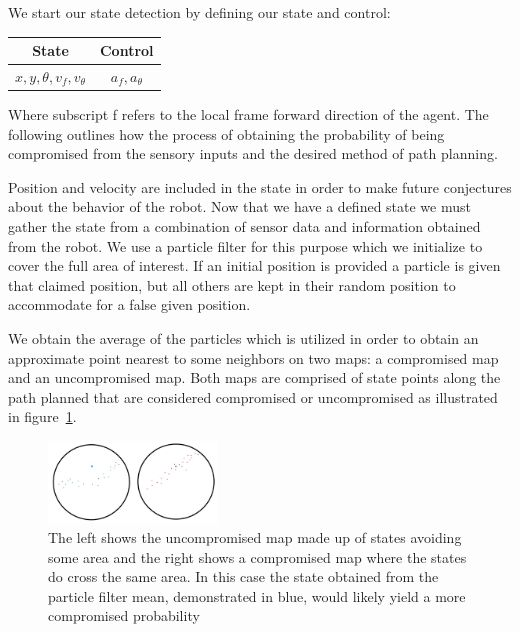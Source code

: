 \documentclass[conference]{IEEEtran}
\begin{document}
We start our state detection by defining our state and control:

\begin{table}[]
\label{table_example}
\begin{center}
\begin{tabular}{|c|c|}
\hline
State & Control\\
\hline
$x,y,\theta,v_f,v_\theta$ & $a_f,a_\theta$\\
\hline
\end{tabular}
\end{center}
\end{table}

Where subscript f refers to the local frame forward direction of the agent. The following outlines how the process of obtaining the probability of being compromised from the sensory inputs and the desired method of path planning.

Position and velocity are included in the state in order to make future conjectures about the behavior of the robot. Now that we have a defined state we must gather the state from a combination of sensor data and information obtained from the robot. We use a particle filter for this purpose which we initialize to cover the full area of interest. If an initial position is provided a particle is given that claimed position, but all others are kept in their random position to accommodate for a false given position.
	
We obtain the average of the particles  which is utilized in order to obtain an approximate point nearest to some neighbors on two maps: a compromised map and an uncompromised map. Both maps are comprised of state points along the path planned that are considered compromised or uncompromised as illustrated in figure~\ref{fig:compmaps}.
	
\begin{figure}[]
\centering
\includegraphics[width=0.4\textwidth]{Path_comp_uncomp}
\caption{The left shows the uncompromised map made up of states avoiding some area and the right shows a compromised map where the states do cross the same area. In this case the state obtained from the particle filter mean, demonstrated in blue, would likely yield a more compromised probability}
\label{fig:compmaps}
\end{figure}
	
\end{document}
